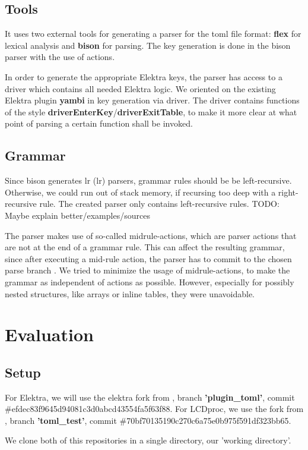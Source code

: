 \documentclass[12pt]{report}
\begin{document}
\section{Tools}
It uses two external tools for generating a parser for the toml file format: \textbf{\acrshort{flex}} \cite{flexgit} for lexical analysis and \textbf{bison} \cite{bisonmain} for parsing.
The key generation is done in the bison parser with the use of actions.

In order to generate the appropriate Elektra keys, the parser has access to a driver which contains all needed Elektra logic.
We oriented on the existing Elektra plugin \textbf{yambi}\cite{elektrayambi} in key generation via driver.
The driver contains functions of the style \textbf{driverEnterKey}/\textbf{driverExitTable}, to make it more clear at what point of parsing a certain function shall be invoked.

\section{Grammar}
Since bison generates \acrshort{lr} (\acrlong{lr}) parsers, grammar rules should be be left-recursive.
Otherwise, we could run out of stack memory, if recursing too deep with a right-recursive rule.
The created parser only contains left-recursive rules.
TODO: Maybe explain better/examples/sources

The parser makes use of so-called midrule-actions, which are parser actions that are not at the end of a grammar rule.
This can affect the resulting grammar, since after executing a mid-rule action, the parser has to commit to the chosen parse branch \cite{bisonmidruleconflicts}.
We tried to minimize the usage of midrule-actions, to make the grammar as independent of actions as possible.
However, especially for possibly nested structures, like arrays or inline tables, they were unavoidable.



\chapter{Evaluation}

\section{Setup}
\begin{sloppypar}
For Elektra, we will use the elektra fork from \cite{bauhausforkelektra}, branch \textbf{'plugin\_toml'}, commit \#efdec83f9645d94081c3d0abcd43554fa5f63f88.
For LCDproc, we use the fork from \cite{bauhausforklcdproc}, branch \textbf{'toml\_test'}, commit \#70bf70135190c270c6a75e0b975f591df323bb65.
\end{sloppypar}
We clone both of this repositories in a single directory, our 'working directory'.
\end{document}

